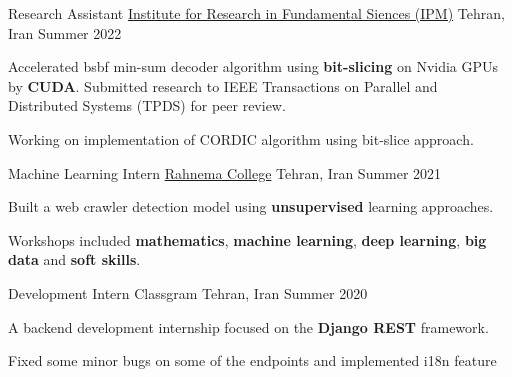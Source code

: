 \begin{cventries}
  \cventry
    {Research Assistant} %
    {\href{https://www.ipm.ac.ir/}{Institute for Research in Fundamental Siences (IPM)}} %
    {Tehran, Iran} %
    {Summer 2022} %
    {
      \begin{cvitems} %
	\item {Accelerated bsbf min-sum decoder algorithm using {\textbf{bit-slicing}} on Nvidia GPUs by {\textbf{CUDA}}. Submitted research to IEEE Transactions on Parallel and Distributed Systems (TPDS) for peer review.}
        \item {Working on implementation of CORDIC algorithm using bit-slice approach.}
      \end{cvitems}
    }

  \cventry
    {Machine Learning Intern} %
    {\href{https://rahnemacollege.com/}{Rahnema College}} %
    {Tehran, Iran} %
    {Summer 2021} %
    {
      \begin{cvitems} %
        \item {Built a web crawler detection model using {\textbf{unsupervised}} learning approaches.}
	\item{Workshops included {\textbf{mathematics}}, {\textbf{machine learning}}, {\textbf{deep learning}}, {\textbf{big data}} and {\textbf{soft skills}}.}
      \end{cvitems}
    }


  \cventry
    {Development Intern} %
    {Classgram} %
    {Tehran, Iran} %
    {Summer 2020} %
    {
      \begin{cvitems} %
	\item {A backend development internship focused on the {\textbf{Django REST}} framework.}
        \item {Fixed some minor bugs on some of the endpoints and implemented i18n feature}
      \end{cvitems}
    }


\end{cventries}
